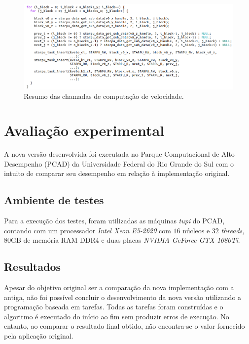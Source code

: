 \documentclass[cic,tc]{iiufrgs}
\begin{document}
\begin{figure}[!htb]
  \caption{Resumo das chamadas de computação de velocidade.}
    \begin{center} 
      \includegraphics[width=35em]{kernels_velo}
    \end{center}
    \label{fig:kernels_velo}
\end{figure}


\chapter{Avaliação experimental}

A nova versão desenvolvida foi executada no Parque Computacional de Alto Desempenho (PCAD) da Universidade Federal do Rio Grande do Sul com o
intuito de comparar seu desempenho em relação à implementação original.

\section{Ambiente de testes}

Para a execução dos testes, foram utilizadas as máquinas \textit{tupi} do PCAD, contando com um processador \textit{Intel Xeon E5-2620} com $16$
núcleos e $32$ \textit{threads}, $80$GB de memória RAM DDR$4$ e duas placas \textit{NVIDIA GeForce GTX 1080Ti}.
\section{Resultados}

Apesar do objetivo original ser a comparação da nova implementação com a antiga, não foi possível concluir o desenvolvimento da nova versão utilizando
a programação baseada em tarefas. Todas as tarefas foram construídas e o algoritmo é executado do início ao fim sem produzir erros de execução. No entanto,
ao comparar o resultado final obtido, não encontra-se o valor fornecido pela aplicação original.
\end{document}
